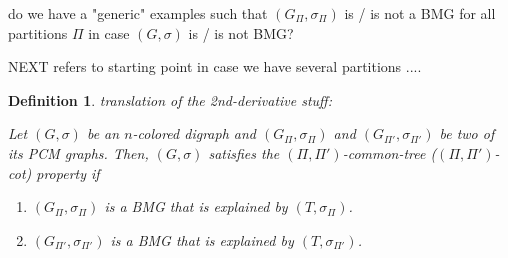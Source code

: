 \documentclass[final,3p,times]{elsarticle}
\newtheorem{definition}{Definition}[section]
\newcommand{\TODO}[1]{\begingroup\color{red}#1\endgroup}
\begin{document}
\TODO{do we have a "generic" examples such that  $(G_\Pi,\sigma_\Pi)$ is / is not a BMG
for all partitions $\Pi$ in case $(G,\sigma)$ is / is not BMG? } 















\TODO{\bigskip \bigskip NEXT refers to starting point in case we have several partitions .... }
\begin{definition}\TODO{translation of the 2nd-derivative stuff:}

Let $(G,\sigma)$ be an $n$-colored digraph 
and $(G_{\Pi},\sigma_{\Pi})$ and $(G_{\Pi'},\sigma_{\Pi'})$ 
be two of its PCM graphs. 
Then, $(G,\sigma)$ satisfies the $(\Pi,\Pi')$-common-tree ($(\Pi,\Pi')$-cot) property
if 
\begin{enumerate}
	\item $(G_{\Pi},\sigma_{\Pi})$ is a BMG that is explained by $(T,\sigma_{\Pi})$.
	\item $(G_{\Pi'},\sigma_{\Pi'})$ is a BMG that is explained by $(T,\sigma_{\Pi'})$.
\end{enumerate}
\end{definition}
\end{document}
